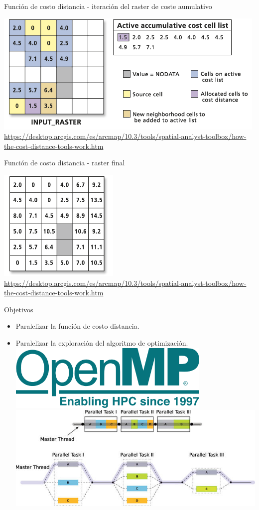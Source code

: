 \documentclass[12pt]{beamer}
\begin{document}
\begin{frame}{Función de costo distancia - iteración del raster de coste aumulativo}
\begin{center}
\includegraphics[scale=2]{costo6.png}
\footnotesize\url{https://desktop.arcgis.com/es/arcmap/10.3/tools/spatial-analyst-toolbox/how-the-cost-distance-tools-work.htm}
\end{center}
\end{frame}

\begin{frame}{Función de costo distancia - raster final}
\begin{center}
\includegraphics[scale=3]{costo7.png}
\footnotesize\url{https://desktop.arcgis.com/es/arcmap/10.3/tools/spatial-analyst-toolbox/how-the-cost-distance-tools-work.htm}
\end{center}
\end{frame}

\begin{frame}{Objetivos}
\begin{itemize}
\item Paralelizar la función de costo distancia.
\item Paralelizar la exploración del algoritmo de optimización.\\
\includegraphics[scale=.1]{openmp.png} 
\includegraphics[scale=.3]{openmp2.jpg}
\end{itemize}

\end{frame}
\end{document}
